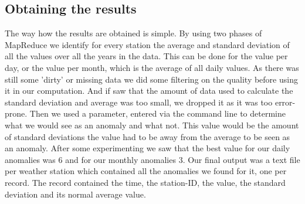 \subsection{Obtaining the results}
The way how the results are obtained is simple. By using two phases of MapReduce we identify for every station the average and standard deviation of all the values over all the years in the data. This can be done for the value per day, or the value per month, which is the average of all daily values. As there was still some 'dirty' or missing data we did some filtering on the quality before using it in our computation. And if saw that the amount of data used to calculate the standard deviation and average was too small, we dropped it as it was too error-prone. Then we used a parameter, entered via the command line to determine what we would see as an anomaly and what not. This value would be the amount of standard deviations the value had to be away from the average to be seen as an anomaly. After some experimenting we saw that the best value for our daily anomalies was 6 and for our monthly anomalies 3. Our final output was a text file per weather station which contained all the anomalies we found for it, one per record. The record contained the time, the station-ID, the value, the standard deviation and its normal average value. \\

